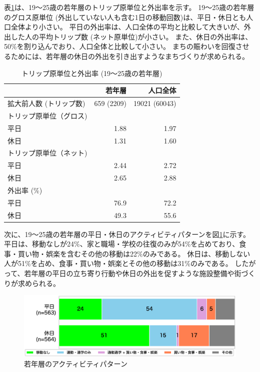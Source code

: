 \documentclass[a4paper,12pt, uplatex]{jsbook}
\begin{document}
表\ref{tab:トリップ_外出率_若年層}は、19〜25歳の若年層のトリップ原単位と外出率を示す。
19〜25歳の若年層のグロス原単位 (外出していない人も含む1日の移動回数)は、平日・休日とも人口全体より小さい。
平日の外出率は、人口全体の平均と比較して大きいが、外出した人の平均トリップ数 (ネット原単位)が小さい。
また、休日の外出率は、50\%を割り込んでおり、人口全体と比較して小さい。
まちの賑わいを回復させるためには、若年層の休日の外出を引き出すようなまちづくりが求められる。
%
\begin{table}[htbp]
\centering
\caption{トリップ原単位と外出率 (19〜25歳の若年層)}
\label{tab:トリップ_外出率_若年層}
\begin{tabular}{lrr}
\toprule
& 若年層 & 人口全体 \\
\midrule
拡大前人数 (トリップ数) & 659 (2209) & 19021 (60043)\\
トリップ原単位（グロス) & & \\
\hspace{2em} 平日 & 1.88 & 1.97 \\
\hspace{2em} 休日 & 1.31 & 1.60 \\
トリップ原単位（ネット) & & \\
\hspace{2em} 平日 & 2.44 & 2.72 \\
\hspace{2em} 休日 & 2.65 & 2.88\\
外出率 (\%) & & \\
\hspace{2em} 平日 & 76.9 & 72.2\\
\hspace{2em} 休日 & 49.3 & 55.6\\
\bottomrule
\end{tabular}
\end{table}

次に、19〜25歳の若年層の平日・休日のアクティビティパターンを図\ref{fig:activity_pattern_young}に示す。
平日は、移動なしが24\%、家と職場・学校の往復のみが54\%を占めており、食事・買い物・娯楽を含むその他の移動は22\%のみである。
休日は、移動しない人が51\%を占め、食事・買い物・娯楽とその他の移動は31\%のみである。
したがって、若年層の平日の立ち寄り行動や休日の外出を促すような施設整備や街づくりが求められる。
%
\begin{figure}[htbp]
    \centering
    \includegraphics[width=1.0\textwidth]{picture/activity_pattern_若年層.eps}
    \caption{若年層のアクティビティパターン}
    \label{fig:activity_pattern_young}
\end{figure}
\end{document}
